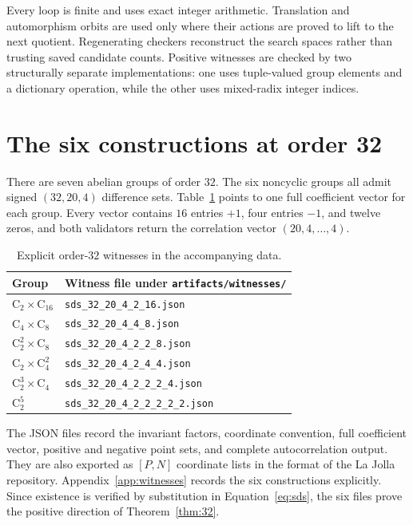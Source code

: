 \documentclass[11pt]{article}
\theoremstyle{remark}
\newcommand{\C}{\mathrm{C}}
\begin{document}
Every loop is finite and uses exact integer arithmetic.  Translation and
automorphism orbits are used only where their actions are proved to lift to
the next quotient.  Regenerating checkers reconstruct the search spaces
rather than trusting saved candidate counts.  Positive witnesses are checked
by two structurally separate implementations: one uses tuple-valued group
elements and a dictionary operation, while the other uses mixed-radix integer
indices.

\section{The six constructions at order 32}

There are seven abelian groups of order $32$.  The six noncyclic groups all
admit signed $(32,20,4)$ difference sets.  Table~\ref{tab:witnesses} points to
one full coefficient vector for each group.  Every vector contains $16$
entries $+1$, four entries $-1$, and twelve zeros, and both validators return
the correlation vector $(20,4,\ldots,4)$.

\begin{table}[ht]
\centering
\caption{Explicit order-$32$ witnesses in the accompanying data.}
\label{tab:witnesses}
\small
\begin{tabular}{@{}ll@{}}
\toprule
Group & Witness file under \texttt{artifacts/witnesses/}\\
\midrule
$\C_2\times\C_{16}$ & \texttt{sds\_32\_20\_4\_2\_16.json}\\
$\C_4\times\C_8$ & \texttt{sds\_32\_20\_4\_4\_8.json}\\
$\C_2^2\times\C_8$ & \texttt{sds\_32\_20\_4\_2\_2\_8.json}\\
$\C_2\times\C_4^2$ & \texttt{sds\_32\_20\_4\_2\_4\_4.json}\\
$\C_2^3\times\C_4$ & \texttt{sds\_32\_20\_4\_2\_2\_2\_4.json}\\
$\C_2^5$ & \texttt{sds\_32\_20\_4\_2\_2\_2\_2\_2.json}\\
\bottomrule
\end{tabular}
\end{table}

The JSON files record the invariant factors, coordinate convention, full
coefficient vector, positive and negative point sets, and complete
autocorrelation output.  They are also exported as $[P,N]$ coordinate lists
in the format of the La Jolla repository.  Appendix~\ref{app:witnesses}
records the six constructions explicitly.  Since existence is verified by
substitution in Equation~\eqref{eq:sds}, the six files prove the positive
direction of Theorem~\ref{thm:32}.
\end{document}
